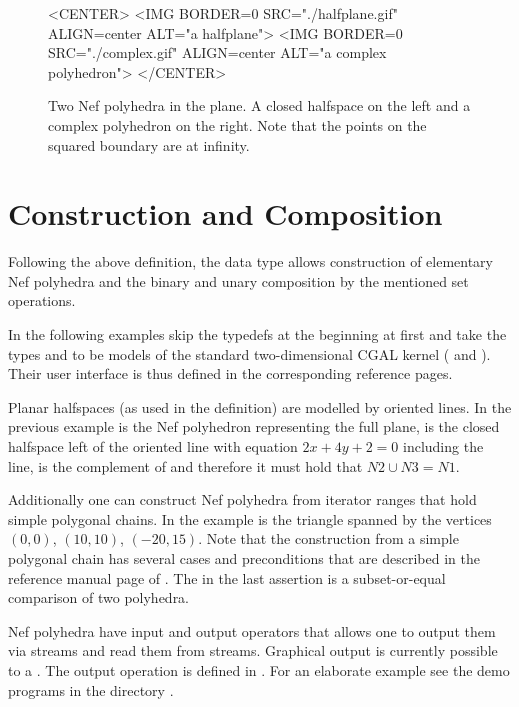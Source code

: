\begin{figure}[htbp]
\begin{ccTexOnly}
\begin{center}
\end{center}
\end{ccTexOnly}
\caption{Two Nef polyhedra in the plane. A closed halfspace on the 
left and a complex polyhedron on the right. Note that the points 
on the squared boundary are at infinity.}\label{nefexamples}
\begin{ccHtmlOnly}
<CENTER>
<IMG BORDER=0 SRC="./halfplane.gif" ALIGN=center
ALT="a halfplane">
<IMG BORDER=0 SRC="./complex.gif" ALIGN=center
ALT="a complex polyhedron">
</CENTER>
\end{ccHtmlOnly}
\end{figure}      

\section{Construction and Composition}

Following the above definition, the data type
 allows construction of elementary Nef
polyhedra and the binary and unary composition by the mentioned set
operations.

In the following examples skip the typedefs at the beginning at first
and take the types  and  to be models of the
standard two-dimensional CGAL kernel (
and ). Their user interface is thus defined in
the corresponding reference pages.


Planar halfspaces (as used in the definition) are modelled by oriented
lines. In the previous example  is the Nef polyhedron
representing the full plane,  is the closed halfspace left of
the oriented line with equation $2x + 4y + 2 = 0$ including the line,
 is the complement of  and therefore it must hold that
$N2 \cup N3 = N1$.

Additionally one can construct Nef polyhedra from iterator ranges that
hold simple polygonal chains. In the example  is the triangle
spanned by the vertices $(0,0)$, $(10,10)$, $(-20,15)$.  Note that the
construction from a simple polygonal chain has several cases and
preconditions that are described in the reference manual page of
. The  in the last assertion
is a subset-or-equal comparison of two polyhedra.

Nef polyhedra have input and output operators that allows one to
output them via streams and read them from streams. Graphical output
is currently possible to a . The output
operation is defined in
. For an elaborate
example see the demo programs in the directory .

